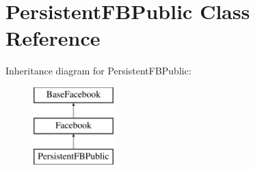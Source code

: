 \hypertarget{classPersistentFBPublic}{\section{Persistent\-F\-B\-Public Class Reference}
\label{classPersistentFBPublic}
}
Inheritance diagram for Persistent\-F\-B\-Public\-:\begin{figure}[H]
\begin{center}
\leavevmode
\includegraphics[height=3.000000cm]{classPersistentFBPublic}
\end{center}
\end{figure}
